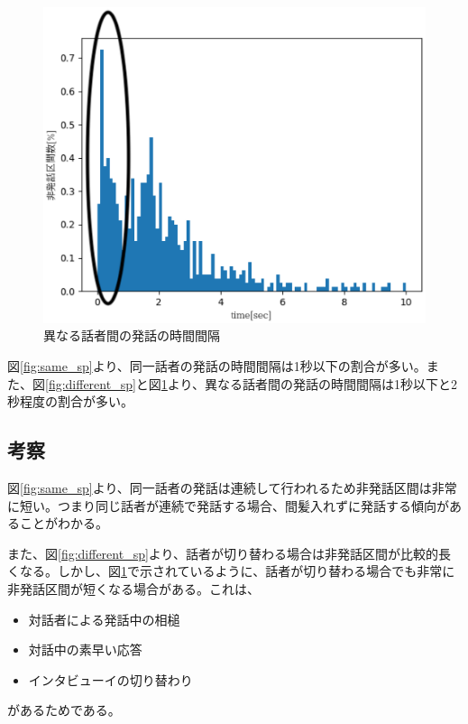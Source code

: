 \begin{figure}[H]
  \begin{center}
    \includegraphics{./figure/pre_other1.eps}
  \end{center}
  \caption{異なる話者間の発話の時間間隔 \label{fig:different_sp2}}
\end{figure}

図\ref{fig:same_sp}より、同一話者の発話の時間間隔は1秒以下の割合が多い。また、図\ref{fig:different_sp}と図\ref{fig:different_sp2}より、異なる話者間の発話の時間間隔は1秒以下と2秒程度の割合が多い。

\subsection{考察}
図\ref{fig:same_sp}より、同一話者の発話は連続して行われるため非発話区間は非常に短い。つまり同じ話者が連続で発話する場合、間髪入れずに発話する傾向があることがわかる。\par
また、図\ref{fig:different_sp}より、話者が切り替わる場合は非発話区間が比較的長くなる。しかし、図\ref{fig:different_sp2}で示されているように、話者が切り替わる場合でも非常に非発話区間が短くなる場合がある。これは、

\begin{itemize}
\item 対話者による発話中の相槌
\item 対話中の素早い応答
\item インタビューイの切り替わり
\end{itemize}

があるためである。
